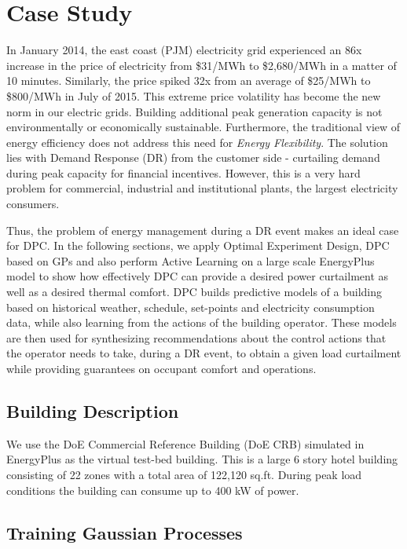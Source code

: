 \section{Case Study}
\label{S:casestudy}

In January 2014, the east coast (PJM) electricity grid experienced an 86x increase in the price of electricity from \$31/MWh to \$2,680/MWh in a matter of 10 minutes. Similarly, the price spiked 32x from an average of \$25/MWh to \$800/MWh in July of 2015. This extreme price volatility has become the new norm in our electric grids. Building additional peak generation capacity is not environmentally or economically sustainable. Furthermore, the traditional view of energy efficiency does not address this need for \emph{Energy Flexibility}. The solution lies with Demand Response (DR) from the customer side - curtailing demand during peak capacity for financial incentives. However, this is a very hard problem for commercial, industrial and institutional plants, the largest electricity consumers.

Thus, the problem of energy management during a DR event makes an ideal case for DPC. In the following sections, we apply Optimal Experiment Design, DPC based on GPs and also perform Active Learning on a large scale EnergyPlus model to show how effectively DPC can provide a desired power curtailment as well as a desired thermal comfort. DPC builds predictive models of a building based on historical weather, schedule, set-points and electricity consumption data, while also learning from the actions of the building operator. These models are then used for synthesizing recommendations about the control actions that the operator needs to take, during a DR event, to obtain a given load curtailment while providing guarantees on occupant comfort and operations.

\subsection{Building Description}
We use the DoE Commercial Reference Building (DoE CRB) simulated in EnergyPlus \cite{Deru2011} as the virtual test-bed building.
This is a large 6 story hotel building consisting of 22 zones with a total area of 122,120 sq.ft. 
During peak load conditions the building can consume up to 400 kW of power.  

\subsection{Training Gaussian Processes}

